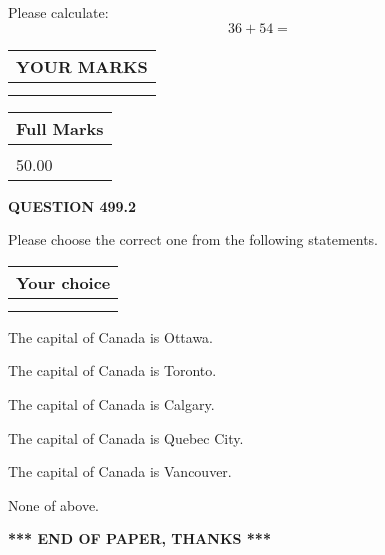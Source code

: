 \documentclass[12pt]{article}
\begin{document}
  
 
Please calculate:
\begin{equation}
36 +  %
54 = \nonumber
\end{equation}
 

 

 
  
\vspace{0.2in}
  
\noindent\begin{tabular}{|l|}
\hline
 YOUR MARKS  \\
\hline
 \\ 
 \\ 
\hline
\end{tabular}
\hspace{0.05in} \begin{tabular}{|l|}
\hline
 Full Marks  \\
\hline
 \\ 
50.00 \\
\hline
\end{tabular}
{\textbf{\Large{QUESTION
499.2 
}}}
  
  
Please choose the correct one from the following statements.
  
  
\noindent\hspace{3.0in} \begin{tabular}{|l|}
\hline
Your choice \\
\hline
 \\ 
 \\ 
\hline
\end{tabular}
  
  
 
 
The capital of Canada is Ottawa.
 
 
The capital of Canada is Toronto.
 
 
The capital of Canada is Calgary.
 
 
The capital of Canada is Quebec City.
 
 
The capital of Canada is Vancouver.
 
 
 None of above.
 
 
   
   
 \vspace{0.2in}
 
   
   
   
   
\vspace{1.0in} 
{\textbf{\large{ *** END OF PAPER, THANKS *** }}} 
   
\end{document}
